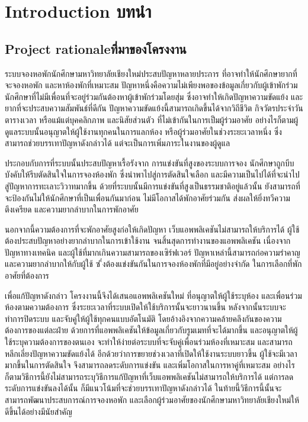 \chapter{\ifenglish Introduction \else บทนำ\fi}
\section{\ifenglish Project rationale\else ที่มาของโครงงาน\fi}

ระบบจองหอพักนักศึกษามหาวิทยาลัยเชียงใหม่ประสบปัญหาหลายประการ ที่อาจทำให้นักศึกษายากที่จะจองหอพัก 
และหาห้องพักที่เหมาะสม ปัญหาหนึ่งคือความไม่เพียงพอของข้อมูลเกี่ยวกับผู้เข้าพักร่วม 
นักศึกษาที่ไม่มีเพื่อนที่จะอยู่ร่วมกันต้องหาผู้เข้าพักร่วมโดยสุ่ม ซึ่งอาจทำให้เกิดปัญหาความขัดแย้ง 
และยากที่จะประสบความสัมพันธ์ที่ดีกัน ปัญหาความขัดแย้งนี้สามารถเกิดขึ้นได้จากวิถีชีวิต กิจวัตรประจำวัน 
ตารางเวลา หรือแม้แต่บุคคลิกภาพ และนิสัยส่วนตัว ที่ไม่เข้ากันในการเป็มผู้ร่วมอาศัย
อย่างไรก็ตามผู้ดูแลระบบนั้นอนุญาตให้ผู้ใช้งานทุกคนในการแลกห้อง หรือผู้ร่วมอาศัยในช่วงระยะเวลาหนึ่ง 
ซึ่งสามารถช่วยบรรเทาปัญหาดังกล่าวได้ แต่จะเป็นการเพิ่มภาระในงานของผู้ดูแล

ประกอบกับการที่ระบบนั้นประสบปัญหาเรื้อรังจาก การแข่งขันที่สูงของระบบการจอง นักศึกษาถูกบีบบังคับให้รีบตัดสินใจในการจองห้องพัก
ซึ่งนำพาไปสู่การตัดสินใจเลือก และมีความเป็นไปได้ที่จะนำไปสู่ปัญหาการทะเลาะวิวาทมากขึ้น ด้วยที่ระบบนั้นมีการแข่งขันที่สูงเป็นธรรมชาติอยู่แล้วนั้น
ยังสามารถที่จะป้องกันไม่ให้นักศึกษาที่เป็นเพื่อนกันมาก่อน ไม่มีโอกาสได้พักอาศัยร่วมกัน ส่งผลให้ยิ่งทวีความตึงเครียด
และความยากลำบากในการพักอาศัย

นอกจากนี้ความต้องการที่จะพักอาศัยสูงก่อให้เกิดปัญหา เว็บแอพพลิเคชันไม่สามารถให้บริการได้ 
ผู้ใช้ต้องประสบปัญหาอย่างยากลำบากในการเข้าใช้งาน จนสิ้นสุดการทำงานของแอพพลิเคชัน เนื่องจากปัญหาทางเทคนิค 
และผู้ใช้ที่มากเกินความสามารถของเซิร์ฟเวอร์ ปัญหาเหล่านี้สามารถก่อความรำคาญ และความยากลำบากให้กับผู้ใช้ ซ
ึ่งต้องแข่งขันกันในการจองห้องพักที่มีอยู่อย่างจำกัด ในการเลือกที่พักอาศัยที่ต้องการ

เพื่อแก้ปัญหาดังกล่าว โครงงานนี้จึงได้เสนอแอพพลิเคชันใหม่ ที่อนุญาตให้ผู้ใช้ระบุห้อง 
และเพื่อนร่วมห้องตามความต้องการ ซึ่งระยะเวลาที่ระบบเปิดให้ใช้บริการนั้นจะยาวนานขึ้น 
หลังจากนั้นระบบจะทำการปิดระบบ และจับคู่ให้ผู้ใช้ทุกคนแบบอัตโนมัติ โดยอ้างอิงจากความคล้ายคลึงกันของความต้องการของแต่ละฝ่าย 
ด้วยการที่แอพพลิเคชันให้ข้อมูลเกี่ยวกับรูมเมทที่จะได้มากขึ้น และอนุญาตให้ผู้ใช้ระบุความต้องการของตนเอง 
จะทำให้ง่ายต่อระบบที่จะจับคู่เพื่อนร่วมห้องที่เหมาะสม และสามารถหลีกเลี่ยงปัญหาความขัดแย้งได้ 
อีกด้วยว่าการขยายช่วงเวลาที่เปิดให้ใช้งานระบบยาวขึ้น ผู้ใช้จะมีเวลามากขึ้นในการตัดสินใจ จึงสามารถลดระดับการแข่งขัน 
และเพิ่มโอกาสในการหาคู่ที่เหมาะสม อย่างไรก็ตามวิธีการนี้ยังไม่สามารถระบุวิธีการแก้ปัญหาที่เว็บแอพพลิเคชันไม่สามารถให้บริการได้
แต่การลดระดับการแข่งขันลงได้นั้น ก็มีแนวโน้มที่จะช่วยบรรเทาปัญหาดังกล่าวได้ 
ในท้ายนี้วิธีการนี้นั้นจะสามารถพัฒนาประสบการณ์การจองหอพัก และเลือกผู้ร่วมอาศัยของนักศึกษามหาวิทยาลัยเชียงใหม่ให้ดีขึ้นได้อย่างมีนัยสำคัญ

